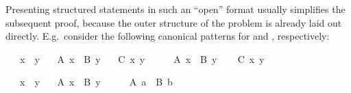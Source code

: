 \begin{isabellebody}
\begin{isamarkuptext}
  Presenting structured statements in such an ``open'' format usually
  simplifies the subsequent proof, because the outer structure of the
  problem is already laid out directly.  E.g.\ consider the following
  canonical patterns for \isa{{\isachardoublequote}{\isasymSHOWS}{\isachardoublequote}} and \isa{{\isachardoublequote}{\isasymOBTAINS}{\isachardoublequote}},
  respectively:%
\end{isamarkuptext}%
\isamarkuptrue%
%
\begin{minipage}{0.5\textwidth}
\isamarkupfalse%
\isanewline
\ \ \ x\ \ y\isanewline
\ \ \ {\isachardoublequoteopen}A\ x{\isachardoublequoteclose}\ \ {\isachardoublequoteopen}B\ y{\isachardoublequoteclose}\isanewline
\ \ \ {\isachardoublequoteopen}C\ x\ y{\isachardoublequoteclose}\isanewline
%
\isadelimproof
%
\endisadelimproof
%
\isatagproof
{}\isamarkupfalse%
\ {\isacharminus}\isanewline
\ \ \isamarkupfalse%
\ {\isacharbackquoteopen}A\ x{\isacharbackquoteclose}\ \ {\isacharbackquoteopen}B\ y{\isacharbackquoteclose}\isanewline
\ \ \isamarkupfalse%
\ {\isachardoublequoteopen}C\ x\ y{\isachardoublequoteclose}%
\endisatagproof
{\isafoldproof}%
%
\isadelimproof
%
\endisadelimproof
%
\isadelimnoproof
\ %
\endisadelimnoproof
%
\isatagnoproof
{}\isamarkupfalse%
%
\endisatagnoproof
{\isafoldnoproof}%
%
\isadelimnoproof
\isanewline
%
\endisadelimnoproof
%
\isadelimproof
%
\endisadelimproof
%
\isatagproof
{}\isamarkupfalse%
%
\endisatagproof
{\isafoldproof}%
%
\isadelimproof
%
\endisadelimproof
%
\end{minipage}\begin{minipage}{0.5\textwidth}
\isamarkupfalse%
\isanewline
\ \ \ x\ \ y\isanewline
\ \ \ {\isachardoublequoteopen}A\ x{\isachardoublequoteclose}\ \ {\isachardoublequoteopen}B\ y{\isachardoublequoteclose}\isanewline
%
\isadelimproof
%
\endisadelimproof
%
\isatagproof
{}\isamarkupfalse%
\ {\isacharminus}\isanewline
\ \ \isamarkupfalse%
\ {\isachardoublequoteopen}A\ a{\isachardoublequoteclose}\ \ {\isachardoublequoteopen}B\ b{\isachardoublequoteclose}%
\endisatagproof
{\isafoldproof}%
%
\isadelimproof
%
\endisadelimproof
%
\isadelimnoproof
\ %
\endisadelimnoproof
%
\isatagnoproof
{}\isamarkupfalse%
%
\endisatagnoproof
{\isafoldnoproof}%

\end{minipage}
\end{isabellebody}

